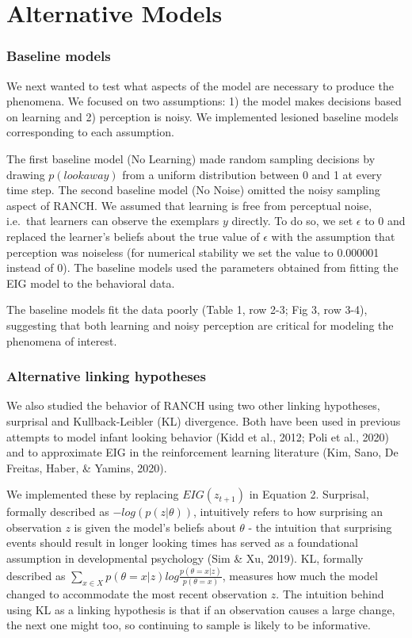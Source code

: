 \documentclass[10pt, letterpaper]{article}
\begin{document}
\hypertarget{alternative-models}{%
\section{Alternative Models}\label{alternative-models}}

\hypertarget{baseline-models}{%
\subsubsection{Baseline models}\label{baseline-models}}

We next wanted to test what aspects of the model are necessary to
produce the phenomena. We focused on two assumptions: 1) the model makes
decisions based on learning and 2) perception is noisy. We implemented
lesioned baseline models corresponding to each assumption.

The first baseline model (No Learning) made random sampling decisions by
drawing \(p(look away)\) from a uniform distribution between 0 and 1 at
every time step. The second baseline model (No Noise) omitted the noisy
sampling aspect of RANCH. We assumed that learning is free from
perceptual noise, i.e.~that learners can observe the exemplars \(y\)
directly. To do so, we set \(\epsilon\) to 0 and replaced the learner's
beliefs about the true value of \(\epsilon\) with the assumption that
perception was noiseless (for numerical stability we set the value to
0.000001 instead of 0). The baseline models used the parameters obtained
from fitting the EIG model to the behavioral data.

The baseline models fit the data poorly (Table 1, row 2-3; Fig 3, row
3-4), suggesting that both learning and noisy perception are critical
for modeling the phenomena of interest. \smallbreak

\hypertarget{alternative-linking-hypotheses}{%
\subsubsection{Alternative linking
hypotheses}\label{alternative-linking-hypotheses}}

We also studied the behavior of RANCH using two other linking
hypotheses, surprisal and Kullback-Leibler (KL) divergence. Both have
been used in previous attempts to model infant looking behavior (Kidd et
al., 2012; Poli et al., 2020) and to approximate EIG in the
reinforcement learning literature (Kim, Sano, De Freitas, Haber, \&
Yamins, 2020).

We implemented these by replacing \(EIG(z_{t+1})\) in Equation 2.
Surprisal, formally described as \(-log(p(z|\theta))\), intuitively
refers to how surprising an observation \(z\) is given the model's
beliefs about \(\theta\) - the intuition that surprising events should
result in longer looking times has served as a foundational assumption
in developmental psychology (Sim \& Xu, 2019). KL, formally described as
\(\sum_{x \in X}{p(\theta = x|z) log \frac{p(\theta = x|z)}{p(\theta = x)}}\),
measures how much the model changed to accommodate the most recent
observation \(z\). The intuition behind using KL as a linking hypothesis
is that if an observation causes a large change, the next one might too,
so continuing to sample is likely to be informative.
\end{document}
